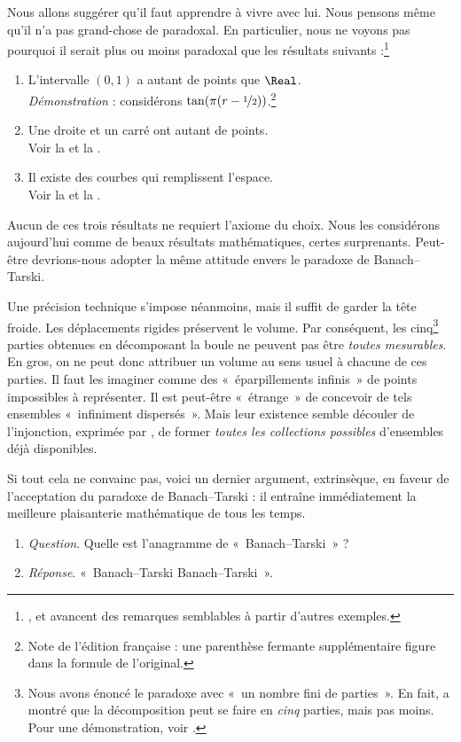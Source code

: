 \documentclass[../../../include/open-logic-section]{subfiles}
\begin{document}
Nous allons suggérer qu'il faut apprendre
à vivre avec lui. Nous pensons même
qu'il n'a pas grand-chose de paradoxal.
En particulier, nous ne voyons pas
pourquoi il serait plus ou moins
paradoxal que les résultats
suivants :\footnote{
\citet[276--7]{Potter2004},
\citet[16]{Weston2003} et
\citet[31, 308--9]{Wagon2016}
avancent des remarques semblables
à partir d'autres exemples.}
\begin{enumerate}
	\item L'intervalle $(0,1)$ a autant
	de points que $\Real$.
	\\\emph{Démonstration} : considérons
	$\tan(\pi(r-\nicefrac{1}{2}))$.\footnote{
	Note de l'édition française : une
	parenthèse fermante supplémentaire
	figure dans la formule de l'original.}
	\item Une droite et un carré ont
	autant de points.
	\\Voir la 
	et la .
	\item Il existe des courbes qui
	remplissent l'espace.
	\\Voir la 
	et la .
\end{enumerate}
Aucun de ces trois résultats ne requiert
l'axiome du choix. Nous les considérons
aujourd'hui comme de beaux résultats
mathématiques, certes surprenants.
Peut-être devrions-nous adopter la
même attitude envers le paradoxe
de Banach--Tarski.

Une précision technique s'impose
néanmoins, mais il suffit de garder
la tête froide. Les déplacements
rigides préservent le volume.
Par conséquent, les cinq\footnote{
Nous avons énoncé le paradoxe avec
«~un nombre fini de parties~».
En fait, \citet{Robinson1947} a montré
que la décomposition peut se faire
en \emph{cinq} parties, mais pas moins.
Pour une démonstration, voir
\citet[pp.~66--7]{Wagon2016}.}
parties obtenues en décomposant
la boule ne peuvent pas être
\emph{toutes mesurables}.
En gros, on ne peut donc attribuer
un volume au sens usuel à chacune
de ces parties. Il faut les imaginer
comme des «~éparpillements infinis~»
de points impossibles à représenter.
Il est peut-être «~étrange~»
de concevoir de tels ensembles
«~infiniment dispersés~».
Mais leur existence semble découler
de l'injonction, exprimée par
\stagesacc{}, de former \emph{toutes
les collections possibles}
d'ensembles déjà disponibles.

Si tout cela ne convainc pas,
voici un dernier argument,
extrinsèque, en faveur de
l'acceptation du paradoxe
de Banach--Tarski : il entraîne
immédiatement la meilleure
plaisanterie mathématique
de tous les temps.
\begin{enumerate}
	\item[] \emph{Question}.
	Quelle est l'anagramme de
	«~Banach--Tarski~» ?
	\item[] \emph{Réponse}.
	«~Banach--Tarski Banach--Tarski~».
\end{enumerate}
\end{document}
